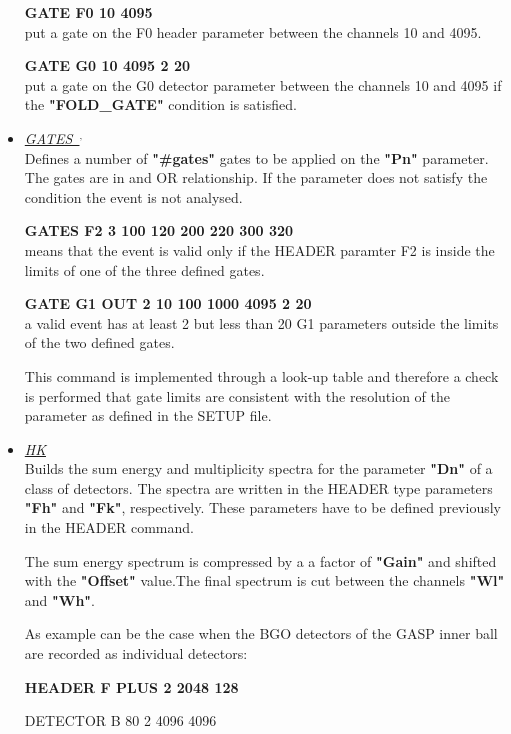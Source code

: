 \begin{itemize}
	\hskip1cm {\bf GATE F0 10 4095} \\
	put a gate on the F0 header parameter between the channels 10 and 
	4095.

	\hskip1cm {\bf GATE G0 10 4095 2 20} \\
	put a gate on the G0 detector parameter between the channels 10 and 
	4095 if the {\bf "FOLD\_GATE"} condition is satisfied.

 \item	{\it\underline{GATES~}}\footnotemark[2]$^,$\footnotemark[3] \\

	Defines a number of {\bf "\#gates"} gates to be applied on the {\bf
	"Pn"} parameter. The gates are in and OR relationship. 
	If the parameter does not 
	satisfy the condition the event is not analysed. 

	\hskip1cm {\bf GATES F2 3 100 120 200 220 300 320 } \\
	means that the event is valid only if the HEADER paramter F2 is inside
	the limits of one of the three defined gates.

	\hskip1cm {\bf GATE G1 OUT 2 10 100 1000 4095 2 20} \\
	a valid event has at least 2 but less than 20 G1 parameters outside 
	the limits of the two defined gates.

	This command is implemented through a look-up table and therefore a 
	check is performed that gate limits are consistent with the resolution 
	of the parameter as defined in the SETUP file.

 \item	{\it\underline{HK}} \\

	Builds the sum energy and multiplicity spectra for the parameter 
	{\bf "Dn"} of a class of detectors. The spectra are written in the
	HEADER type parameters {\bf "Fh"} and {\bf "Fk"}, respectively.
	These parameters have to be defined previously in the HEADER command.

	The sum energy spectrum is compressed by a a factor of {\bf "Gain"} 
	and shifted with the {\bf "Offset"} value.The final spectrum is cut
	between the channels {\bf "Wl"} and {\bf "Wh"}.

	As example can be the case when the BGO detectors of the GASP inner
	ball are recorded as individual detectors:
	
	\hskip1cm{\bf HEADER F PLUS 2 2048 128
	
	\hskip1cm     DETECTOR B 80 2 4096 4096

}
\end{itemize}
